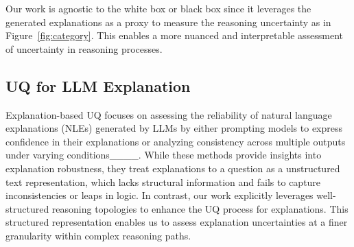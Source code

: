 Our work is agnostic to the white box or black box since it leverages the generated explanations as a proxy to measure the reasoning uncertainty as in Figure~\ref{fig:category}. This enables a more nuanced and interpretable assessment of uncertainty in reasoning processes.


\subsection{UQ for LLM Explanation} 
Explanation-based UQ focuses on assessing the reliability of natural language explanations (NLEs) generated by LLMs by either prompting models to express confidence in their explanations or analyzing consistency across multiple outputs under varying conditions____. While these methods provide insights into explanation robustness, they treat explanations to a question as a unstructured text representation, which lacks structural information and fails to capture inconsistencies or leaps in logic. In contrast, our work explicitly leverages well-structured reasoning topologies to enhance the UQ process for explanations. This structured representation enables us to assess explanation uncertainties at a finer granularity within complex reasoning paths.